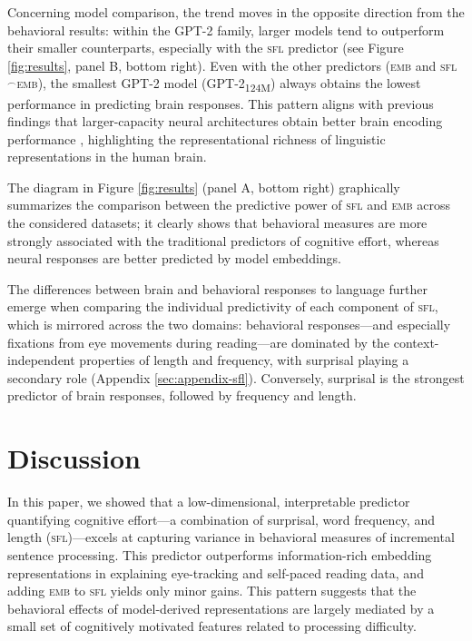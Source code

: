 \documentclass[11pt]{article}
\begin{document}
\smallskip 

Concerning model comparison, the trend moves in the opposite direction from the behavioral results: within the GPT-2 family, larger models tend to outperform their smaller counterparts, especially with the \textsc{sfl} predictor (see Figure \ref{fig:results}, panel B, bottom right). Even with the other predictors (\textsc{emb} and \textsc{sfl}$^\frown$\textsc{emb}), the smallest GPT-2 model (GPT-2\textsubscript{124M}) always obtains the lowest performance in predicting brain responses. This pattern aligns with previous findings that larger-capacity neural architectures  obtain better brain encoding performance \citep{schrimpf2021neural, antonello2023scaling}, highlighting the representational richness of linguistic representations in the human brain.

\smallskip 

The diagram in Figure \ref{fig:results} (panel A, bottom right) graphically summarizes the comparison between the predictive power of \textsc{sfl} and \textsc{emb} across the considered datasets; it clearly shows that behavioral measures are more strongly associated with the traditional predictors of cognitive effort, whereas neural responses are better predicted by model embeddings.

\smallskip

The differences between brain and behavioral responses to language further emerge when comparing the individual predictivity of each component of \textsc{sfl}, which is mirrored across the two domains: behavioral responses---and especially fixations from eye movements during reading---are dominated by the context-independent properties of length and frequency, with surprisal playing a secondary role (Appendix \ref{sec:appendix-sfl}). Conversely, surprisal is the strongest predictor of brain responses, followed by frequency and length. 



\section{Discussion} \label{sec:discussion}

In this paper, we showed that a low-dimensional, interpretable predictor quantifying cognitive effort---a combination of surprisal, word frequency, and length (\textsc{sfl})---excels at capturing variance in behavioral measures of incremental sentence processing. This predictor outperforms information-rich embedding representations in explaining eye-tracking and self-paced reading data, and adding \textsc{emb} to \textsc{sfl} yields only minor gains. This pattern suggests that the behavioral effects of model-derived representations are largely mediated by a small set of cognitively motivated features related to processing difficulty. 
\end{document}
